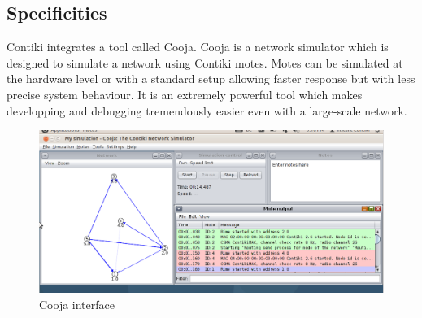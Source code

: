 \subsection{Specificities}
Contiki integrates a tool called Cooja.
Cooja is a network simulator which is designed to simulate a network using Contiki motes.
Motes can be simulated at the hardware level or with a standard setup allowing faster response but with less precise system behaviour.
It is an extremely powerful tool which makes developping and debugging tremendously easier even with a large-scale network.

\begin{figure}[!h]
    \centering
    \includegraphics[scale=0.4]{assets/cooja.png}
    \caption{\label{fig:cooja}Cooja interface}
\end{figure}

